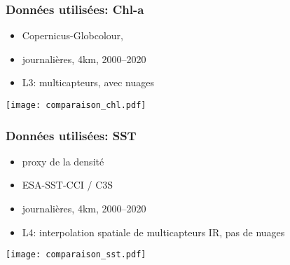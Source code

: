 \documentclass[11pt, french, aspectratio=32]{beamer}
\begin{document}
\begin{frame}
\end{frame}



\begin{frame}
  \frametitle{Données utilisées: Chl-a}

  \begin{block}{}
    \begin{itemize}
      \item Copernicus-Globcolour,
      \item journalières, 4km, 2000--2020
      \item L3: multicapteurs, avec nuages
    \end{itemize}
  \end{block}

  \vfill

  {\footnotesize\textit{\raisebox{2em}{22 avril 2007}}}
  \texttt{[image: comparaison\_chl.pdf]}%
\end{frame}



\begin{frame}
  \frametitle{Données utilisées: SST}

  \begin{block}{}
    \begin{itemize}
      \item proxy de la densité
      \item ESA-SST-CCI / C3S
      \item journalières, 4km, 2000--2020
      \item L4: interpolation spatiale de multicapteurs IR, pas de nuages
    \end{itemize}
  \end{block}

  \vfill

  {\footnotesize\textit{\raisebox{2em}{22 avril 2007}}}
  \texttt{[image: comparaison\_sst.pdf]}%

\end{frame}

\end{document}
